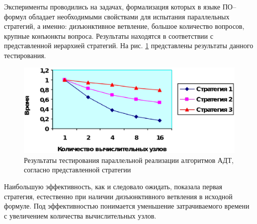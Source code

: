 Эксперименты проводились на задачах, формализация которых в языке ПО--формул обладает необходимыми свойствами для испытания параллельных стратегий, а именно: дизъюнктивное ветвление, большое количество вопросов, крупные конъюнкты вопроса. Результаты находятся в соответствии с представленной иерархией стратегий. На рис. \ref{fig:parallel} представлены результаты данного тестирования.
\begin{figure}[h]
	\centering
	\includegraphics[width=0.7\linewidth]{pics/Parallel.eps}
	\caption{Результаты тестирования параллельной реализации алгоритмов АДТ, согласно представленной стратегии}
	\label{fig:parallel}
\end{figure}

Наибольшую эффективность, как и следовало ожидать, показала первая стратегия, естественно при наличии дизъюнктивного ветвления в исходной формуле. Под эффективностью понимается уменьшение затрачиваемого времени с увеличением количества вычислительных узлов.


